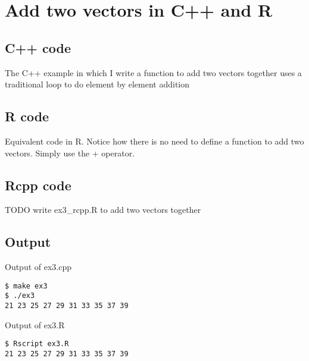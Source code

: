 \chapter{Add two vectors in C++ and R}

\section{C++ code}
The C++ example in which I write a function to add two vectors together uses a traditional loop to do element by element addition

\lstset{language=C++, showspaces=false, showstringspaces=false}


\section{R code}
Equivalent code in R. Notice how there is no need to define a function to add two vectors. Simply use the + operator.

\lstset{language=R, showspaces=false, showstringspaces=false}


\section{Rcpp code}
TODO write ex3\_rcpp.R to add two vectors together
%

\section{Output}

Output of ex3.cpp
\begin{verbatim}
$ make ex3
$ ./ex3
21 23 25 27 29 31 33 35 37 39
\end{verbatim}
Output of ex3.R
\begin{verbatim}
$ Rscript ex3.R
21 23 25 27 29 31 33 35 37 39
\end{verbatim}